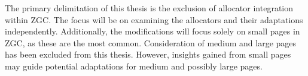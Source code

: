 The primary delimitation of this thesis is the exclusion of allocator integration within ZGC. The focus will be on examining the allocators and their adaptations independently. Additionally, the modifications will focus solely on small pages in ZGC, as these are the most common. Consideration of medium and large pages has been excluded from this thesis. However, insights gained from small pages may guide potential adaptations for medium and possibly large pages.

